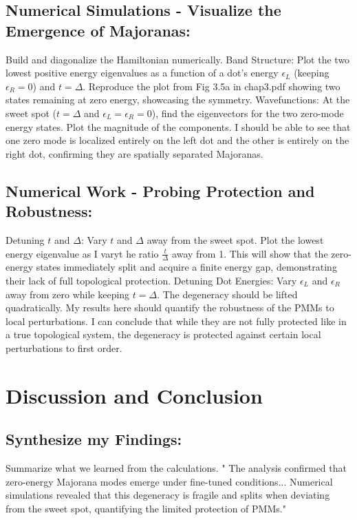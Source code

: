 \documentclass[11pt, letterpaper, titlepage]{article}
\begin{document}
\subsection{Numerical Simulations - Visualize the Emergence of Majoranas:} Build and diagonalize the Hamiltonian numerically. Band Structure: Plot the two lowest positive energy eigenvalues as a function of a dot's energy $ϵ_L$ (keeping $ϵ_R = 0$) and $t = Δ$. Reproduce the plot from Fig 3.5a in chap3.pdf showing two states remaining at zero energy, showcasing the symmetry. Wavefunctions: At the sweet spot ($t = Δ$ and $ϵ_L = ϵ_R = 0$), find the eigenvectors for the two zero-mode energy states. Plot the magnitude of the components. I should be able to see that one zero mode is localized entirely on the left dot and the other is entirely on the right dot, confirming they are spatially separated Majoranas.\\
\subsection{Numerical Work - Probing Protection and Robustness:} Detuning $t$ and $Δ$: Vary $t$ and $Δ$ away from the sweet spot. Plot the lowest energy eigenvalue as I varyt he ratio $\frac{t}{Δ}$ away from 1. This will show that the zero-energy states immediately split and acquire a finite energy gap, demonstrating their lack of full topological protection. Detuning Dot Energies: Vary $ϵ_L$ and $ϵ_R$ away from zero while keeping $t = Δ$. The degeneracy should be lifted quadratically. My results here should quantify the robustness of the PMMs to local perturbations. I can conclude that while they are not fully protected like in a true topological system, the degeneracy is protected against certain local perturbations to first order.\\

\section{Discussion and Conclusion}
\subsection{Synthesize my Findings:} Summarize what we learned from the calculations. " The analysis confirmed that zero-energy Majorana modes emerge under fine-tuned conditions... Numerical simulations revealed that this degeneracy is fragile and splits when deviating from the sweet spot, quantifying the limited protection of PMMs."\\
\end{document}
